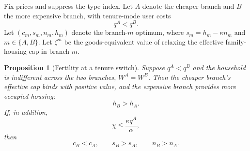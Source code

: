 \documentclass[11pt]{article}
\newtheorem{proposition}{Proposition}
\newcommand{\1}{\mathbf 1}
\begin{document}
Fix prices and suppress the type index. Let $A$ denote the cheaper branch and $B$ the more expensive branch, with tenure-mode user costs
\[
q^A<q^B.
\]
Let $(c_m,s_m,n_m,h_m)$ denote the branch-$m$ optimum, where $s_m=h_m-\kappa n_m$ and $m\in\{A,B\}$. Let $\zeta^m$ be the goods-equivalent value of relaxing the effective family-housing cap in branch $m$.

\begin{proposition}[Fertility at a tenure switch]
\label{prop:tenure_switch_fertility}
Suppose $q^A<q^B$ and the household is indifferent across the two branches, $W^A=W^B$. Then the cheaper branch's effective cap binds with positive value, and the expensive branch provides more occupied housing:
\[
h_B>h_A.
\]
If, in addition,
\[
\chi\le \frac{\kappa q^A}{\alpha},
\]
then
\[
c_B<c_A,
\qquad
s_B>s_A,
\qquad
n_B>n_A.
\]
\end{proposition}
\end{document}
